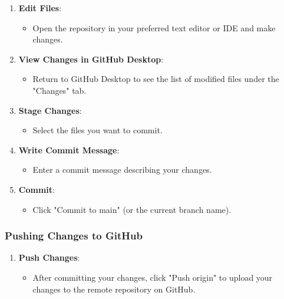 \begin{enumerate}
    \item \textbf{Edit Files}:
    \begin{itemize}
        \item Open the repository in your preferred text editor or IDE and make changes.
    \end{itemize}

    \item \textbf{View Changes in GitHub Desktop}:
    \begin{itemize}
        \item Return to GitHub Desktop to see the list of modified files under the "Changes" tab.
    \end{itemize}

    \item \textbf{Stage Changes}:
    \begin{itemize}
        \item Select the files you want to commit.
    \end{itemize}

    \item \textbf{Write Commit Message}:
    \begin{itemize}
        \item Enter a commit message describing your changes.
    \end{itemize}

    \item \textbf{Commit}:
    \begin{itemize}
        \item Click "Commit to main" (or the current branch name).
    \end{itemize}
\end{enumerate}

\subsubsection{Pushing Changes to GitHub}

\begin{enumerate}
    \item \textbf{Push Changes}:
    \begin{itemize}
        \item After committing your changes, click "Push origin" to upload your changes to the remote repository on GitHub.
    \end{itemize}
\end{enumerate}

